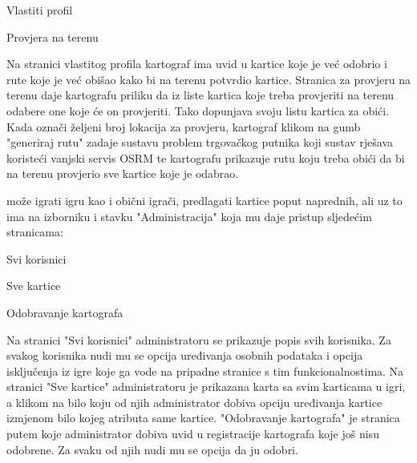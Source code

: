		\begin{packed_item}
		    \item Vlastiti profil
		    \item Provjera na terenu
		\end{packed_item}
		
		Na stranici vlastitog profila kartograf ima uvid u kartice koje je već odobrio i rute koje je već obišao kako bi na terenu potvrdio kartice. Stranica za provjeru na terenu daje kartografu priliku da iz liste kartica koje treba provjeriti na terenu odabere one koje će on provjeriti. Tako dopunjava svoju listu kartica za obići. Kada označi željeni broj lokacija za provjeru, kartograf klikom na gumb "generiraj rutu" zadaje sustavu problem trgovačkog putnika koji sustav rješava koristeći vanjski servis OSRM te kartografu prikazuje rutu koju treba obići da bi na terenu provjerio sve kartice koje je odabrao.
		
		 može igrati igru kao i obični igrači, predlagati kartice poput naprednih, ali uz to ima na izborniku i stavku "Administracija" koja mu daje pristup sljedećim stranicama:
		
		\begin{packed_item}
		    \item Svi korisnici
		    \item Sve kartice
		    \item Odobravanje kartografa
		\end{packed_item}
		
		Na stranici "Svi korisnici" administratoru se prikazuje popis svih korisnika. Za svakog korisnika nudi mu se opcija uređivanja osobnih podataka i opcija isključenja iz igre koje ga vode na pripadne stranice s tim funkcionalnostima. Na stranici "Sve kartice" administratoru je prikazana karta sa svim karticama u igri, a klikom na bilo koju od njih administrator dobiva opciju uređivanja kartice izmjenom bilo kojeg atributa same kartice. "Odobravanje kartografa" je stranica putem koje administrator dobiva uvid u registracije kartografa koje još nisu odobrene. Za svaku od njih nudi mu se opcija da ju odobri.
		
		
